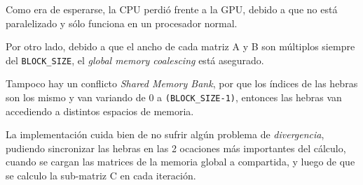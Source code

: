 Como era de esperarse, la CPU perdió frente a la GPU,
debido a que no está paralelizado y sólo funciona en un procesador
normal.

Por otro lado, debido a que el ancho de cada matriz A y B
son múltiplos siempre del \texttt{BLOCK\_SIZE}, el
\emph{global memory coalescing} está asegurado.

Tampoco hay un conflicto \emph{Shared Memory Bank}, por que los índices
de las hebras son los mismo y van variando de 0 a \texttt{(BLOCK\_SIZE-1)},
entonces las hebras van accediendo a distintos espacios de memoria.

La implementación cuida bien de no sufrir algún problema de \emph{divergencia},
pudiendo sincronizar las hebras en las 2 ocaciones más importantes
del cálculo, cuando se cargan las matrices de la memoria global a compartida,
y luego de que se calculo la sub-matriz C en cada iteración.

